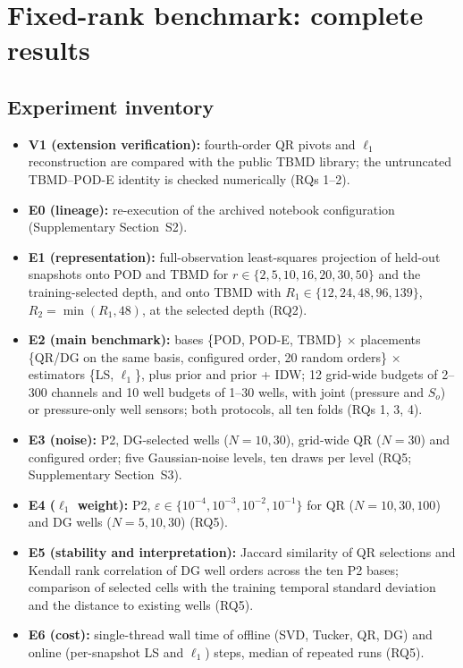 \section{Fixed-rank benchmark: complete results}
\label{sec:S_legacy}

\subsection{Experiment inventory}

\begin{itemize}
\item \textbf{V1 (extension verification):} fourth-order QR pivots and $\ell_1$ reconstruction are compared with the public TBMD library; the untruncated TBMD--POD-E identity is checked numerically (RQs 1--2).
\item \textbf{E0 (lineage):} re-execution of the archived notebook configuration (Supplementary Section~S2).
\item \textbf{E1 (representation):} full-observation least-squares projection of held-out snapshots onto POD and TBMD for $r\in\{2,\allowbreak 5,\allowbreak 10,\allowbreak 16,\allowbreak 20,\allowbreak 30,\allowbreak 50\}$ and the training-selected depth, and onto TBMD with $R_1\in\{12,\allowbreak 24,\allowbreak 48,\allowbreak 96,\allowbreak 139\}$, $R_2=\min(R_1,48)$, at the selected depth (RQ2).
\item \textbf{E2 (main benchmark):} bases \{POD, POD-E, TBMD\} $\times$ placements \{QR/DG on the same basis, configured order, 20 random orders\} $\times$ estimators \{LS, $\ell_1$\}, plus prior and prior + IDW; 12 grid-wide budgets of 2--300 channels and 10 well budgets of 1--30 wells, with joint (pressure and $S_o$) or pressure-only well sensors; both protocols, all ten folds (RQs 1, 3, 4).
\item \textbf{E3 (noise):} P2, DG-selected wells ($N=10,30$), grid-wide QR ($N=30$) and configured order; five Gaussian-noise levels, ten draws per level (RQ5; Supplementary Section~S3).
\item \textbf{E4 ($\ell_1$ weight):} P2, $\varepsilon\in\{10^{-4},10^{-3},10^{-2},10^{-1}\}$ for QR ($N=10,30,100$) and DG wells ($N=5,10,30$) (RQ5).
\item \textbf{E5 (stability and interpretation):} Jaccard similarity of QR selections and Kendall rank correlation of DG well orders across the ten P2 bases; comparison of selected cells with the training temporal standard deviation and the distance to existing wells (RQ5).
\item \textbf{E6 (cost):} single-thread wall time of offline (SVD, Tucker, QR, DG) and online (per-snapshot LS and $\ell_1$) steps, median of repeated runs (RQ5).

\end{itemize}
